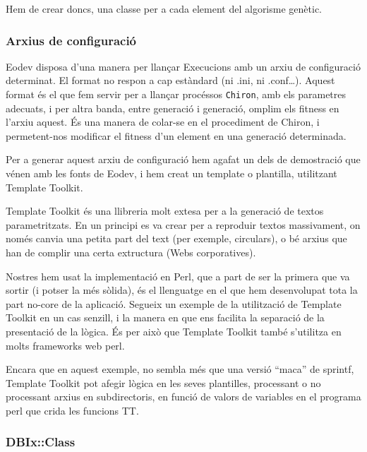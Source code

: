 \documentclass[titlepage,a4paper,12pt]{book}
\begin{document}
Hem de crear doncs, una classe per a cada element del algorisme genètic.




\subsubsection{Arxius de configuració} %
\label{ssub:Arxius de configuracio}

Eodev disposa d'una manera per llançar Execucions amb un arxiu de configuració
determinat.  El format no respon a cap estàndard (ni .ini, ni .conf\ldots).
Aquest format és el que fem servir per a llançar procéssos \texttt{Chiron}, amb
els parametres adecuats, i per altra banda, entre generació i generació, omplim
els fitness en l'arxiu aquest.  És una manera de colar-se en el procediment de
Chiron, i permetent-nos modificar el fitness d'un element en una generació
determinada.

Per a generar aquest arxiu de configuració hem agafat un dels de demostració que
vénen amb les fonts de Eodev, i hem creat un template o plantilla, utilitzant
Template Toolkit.

Template Toolkit és una llibreria molt extesa per a la generació de textos
parametritzats.  En un principi es va crear per a reproduir textos massivament,
on només canvia una petita part del text (per exemple, circulars), o bé arxius
que han de complir una certa extructura (Webs corporatives).

Nostres hem usat la implementació en Perl, que a part de ser la primera que va
sortir (i potser la més sòlida), és el llenguatge en el que hem desenvolupat
tota la part no-core de la aplicació.  Segueix un exemple de la utilització de
Template Toolkit en un cas senzill, i la manera en que ens facilita la separació
de la presentació de la lògica.  És per això que Template Toolkit també
s'utilitza en molts frameworks web perl.


Encara que en aquest exemple, no sembla més que una versió ``maca'' de sprintf,
Template Toolkit pot afegir lògica en les seves plantilles, processant o no
processant arxius en subdirectoris, en funció de valors de variables en el
programa perl que crida les funcions TT.


\subsubsection{DBIx::Class} %
\label{ssub:DBIx Class}
\end{document}

